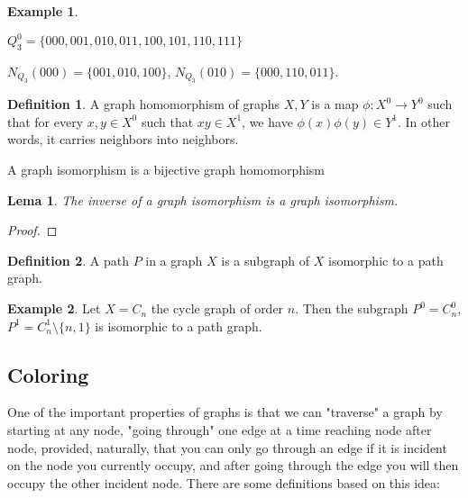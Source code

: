 \documentclass[]{article}
\newtheorem{lemma}{Lema}[section]
\theoremstyle{definition}
\newtheorem{definition}{Definition}[section]
\theoremstyle{definition}
\newtheorem{exmp}{Example}[section]
\newcommand{\raw}{\rightarrow}
\begin{document}
	\begin{exmp}
		\begin{center}
			$Q_3^0 = \{000, 001, 010, 011, 100,101,110,111\}$
			
			$N_{Q_3}(000) = \{001, 010, 100\}$, $N_{Q_3}(010) = \{000, 110, 011\}$.
		\end{center}
		
	\end{exmp}
	
	\begin{definition}
		A graph homomorphism of graphs $X, Y$ is a map $\phi: X^0 \raw Y^0$ such that for every $x, y \in X^0$ such that $xy \in X^1$, we have $\phi(x)\phi(y) \in Y^1$. In other words, it carries neighbors into neighbors.
		
		A graph isomorphism is a bijective graph homomorphism
	\end{definition}
	
	\begin{lemma}
		The inverse of a graph isomorphism is a graph isomorphism.
	\end{lemma}
	
	\begin{proof}
		
	\end{proof}
	
	\begin{definition}
		A path $P$ in a graph $X$ is a subgraph of $X$ isomorphic to a path graph. 
	\end{definition}
	
	\begin{exmp}
		Let $X = C_n$ the cycle graph of order $n$. Then the subgraph $P^0 = C_n^0$, $P^1 = C_n^1 \setminus \{n, 1\}$ is isomorphic to a path graph.
	\end{exmp}
	
	
	\subsection{Coloring}
	
	
	One of the important properties of graphs is that we can "traverse" a graph by starting at any node, "going through" one edge at a time reaching node after node, provided, naturally, that you can only go through an edge if it is incident on the node you currently occupy, and after going through the edge you will then occupy the other incident node. There are some definitions based on this idea:
	
\end{document}
